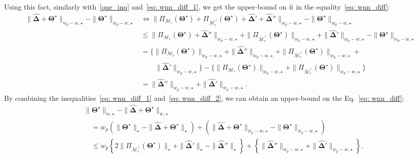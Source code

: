 \documentclass[alpha-refs]{wiley-article}
\newcommand{\RN}[1]{ \textup{\uppercase\expandafter{\romannumeral#1}} }
\begin{document}
Using this fact, similarly with~\eqref{one_inq} and~\eqref{eq: wnn_diff_1}, we get the upper-bound on $\RN{2}$ in the equality~\eqref{eq: wnn_diff}:
\begin{align}
\|\boldsymbol{\widehat{\Delta}} + \boldsymbol{\Theta^{\star}}\|_{w_{p} - w, \star} -  \|\boldsymbol{\Theta^{\star}}\|_{w_{p} - w, \star}
 & \Leftrightarrow  \|\Pi_{\mathcal{M}_{r}}(\boldsymbol{\Theta^{\star}}) + \Pi_{\overline{\mathcal{M}}_{r}^{\perp}}(\boldsymbol{\Theta^{\star}}) + \boldsymbol{\widehat{\Delta}}' + \boldsymbol{\widehat{\Delta}}''\|_{w_{p} - w, \star} - \|\boldsymbol{\Theta^{\star}}\|_{w_{p} - w, \star} \nonumber\\
 & \leq \|\Pi_{\mathcal{M}_{r}}(\boldsymbol{\Theta^{\star}}) + \boldsymbol{\widehat{\Delta}}''\|_{w_{p} - w, \star} + \| \Pi_{\overline{\mathcal{M}}_{r}^{\perp}}(\boldsymbol{\Theta^{\star}}) \|_{w_{p} - w, \star} + \|\boldsymbol{\widehat{\Delta}}'\|_{w_{p} - w, \star} - \|\boldsymbol{\Theta^{\star}}\|_{w_{p} - w, \star} \nonumber\\
 & = \bigg\{ \|\Pi_{\mathcal{M}_{r}}(\boldsymbol{\Theta^{\star}})\|_{w_{p} - w, \star} + \| \boldsymbol{\widehat{\Delta}}''\|_{w_{p} - w, \star}  + \| \Pi_{\overline{\mathcal{M}}_{r}^{\perp}}(\boldsymbol{\Theta^{\star}}) \|_{w_{p} - w, \star} + \nonumber\\
 & \qquad \|\boldsymbol{\widehat{\Delta}}' \|_{w_{p} - w, \star} \bigg\}  - \bigg\{ \|\Pi_{\mathcal{M}_{r}}(\boldsymbol{\Theta^{\star}})\|_{w_{p} - w, \star} + \| \Pi_{\overline{\mathcal{M}}_{r}^{\perp}}(\boldsymbol{\Theta^{\star}}) \|_{w_{p} - w, \star} \bigg\} \nonumber\\
 & = \|\boldsymbol{\widehat{\Delta}}''\|_{w_{p} - w, \star}  + \|\boldsymbol{\widehat{\Delta}}'\|_{w_{p} - w, \star}. \label{eq: wnn_diff_2}
\end{align}
By combining the inequalities~\eqref{eq: wnn_diff_1} and~\eqref{eq: wnn_diff_2}, we can obtain an upper-bound on the Eq.~\eqref{eq: wnn_diff};
\begin{align}
    &\|\boldsymbol{\Theta^{\star}}\|_{w,\star} - \|\boldsymbol{\widehat{\Delta}} + \boldsymbol{\Theta^{\star}}\|_{w,\star} \nonumber \\
    &\quad =   w_{p}(\|\boldsymbol{\Theta^{\star}}\|_{\star} - \|\boldsymbol{\widehat{\Delta}} + \boldsymbol{\Theta^{\star}}\|_{\star}) + (\|\boldsymbol{\widehat{\Delta}} + \boldsymbol{\Theta^{\star}}\|_{w_{p}-w,\star} - \|\boldsymbol{\Theta^{\star}}\|_{w_{p}-w,\star} )  \nonumber\\
    &\quad \leq  w_{p}\left\lbrace 2\|\Pi_{\overline{\mathcal{M}}_{r}^{\perp}}(\boldsymbol{\Theta^{\star}})\|_{\star} + \|\boldsymbol{\widehat{\Delta}}'\|_{\star} - \|\boldsymbol{\widehat{\Delta}}''\|_{\star}  \right\rbrace + \left\lbrace \|\boldsymbol{\widehat{\Delta}}''\|_{w_{p} - w, \star}  + \|\boldsymbol{\widehat{\Delta}}'\|_{w_{p} - w, \star}\right\rbrace.\nonumber
\end{align}
\end{document}
